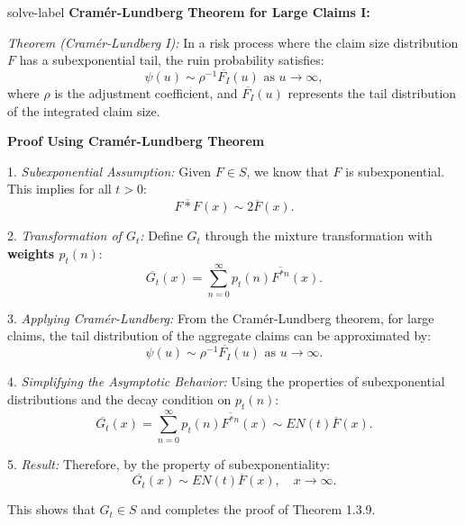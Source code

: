 	\begin{solve}{}{solve-label}
\textbf{Cramér-Lundberg Theorem for Large Claims I:}

\textit{Theorem (Cramér-Lundberg I):} In a risk process where the claim size distribution $F$ has a subexponential tail, the ruin probability satisfies:
\[
\psi(u) \sim \rho^{-1} \overline{F_I}(u) \text{ as } u \to \infty,
\]
where $\rho$ is the adjustment coefficient, and $\overline{F_I}(u)$ represents the tail distribution of the integrated claim size.

\textbf{Proof Using Cramér-Lundberg Theorem}

1. \textit{Subexponential Assumption:}
Given $F \in S$, we know that $F$ is subexponential. This implies for all $t > 0$:
\[
\overline{F*F}(x) \sim 2\overline{F}(x).
\]

2. \textit{Transformation of $G_t$:}
Define $G_t$ through the mixture transformation with \textbf{weights $p_t(n)$}:
\[
\overline{G_t}(x) = \sum_{n=0}^{\infty} p_t(n) \overline{F^{*n}}(x).
\]

3. \textit{Applying Cramér-Lundberg:}
From the Cramér-Lundberg theorem, for large claims, the tail distribution of the aggregate claims can be approximated by:
\[
\psi(u) \sim \rho^{-1} \overline{F_I}(u) \text{ as } u \to \infty.
\]

4. \textit{Simplifying the Asymptotic Behavior:}
Using the properties of subexponential distributions and the decay condition on $p_t(n)$:
\[
\overline{G_t}(x) = \sum_{n=0}^{\infty} p_t(n) \overline{F^{*n}}(x) \sim EN(t) \overline{F}(x).
\]

5. \textit{Result:}
Therefore, by the property of subexponentiality:
\[
\overline{G_t}(x) \sim EN(t) \overline{F}(x), \quad x \to \infty.
\]

This shows that $G_t \in S$ and completes the proof of Theorem 1.3.9. \\\cite{r1,r2,r3}
	\end{solve}
	
	
	
	
	
